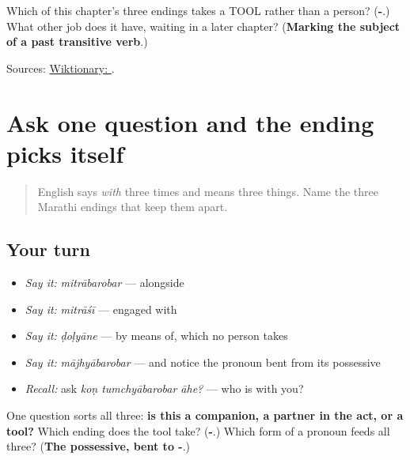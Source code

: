 \begin{tcolorbox}[breakable,colback=teal!4,colframe=teal!35!black,title={Before you move on}]
Which of this chapter's three endings takes a TOOL rather than a person? (\textbf{-}.) What other job does it have, waiting in a later chapter? (\textbf{Marking the subject of a past transitive verb}.)

Sources: \href{https://en.wiktionary.org/wiki/\%E0\%A4\%A8\%E0\%A5\%87}{Wiktionary: }.
\end{tcolorbox}
\section[\texorpdfstring{\mr{बरोबर} · -\mr{शी} · -\mr{ने} (barobar · -śī · -ne)}{बरोबर · -शी · -ने (barobar · -śī · -ne)}]{Ask one question and the ending picks itself}

\label{lesson:MR-R45-with}



\begin{quote}
English says \emph{with} three times and means three things. Name the three Marathi endings that keep them apart.
\end{quote}

\subsection*{Your turn}
\begin{itemize}
\raggedright
  \item \emph{Say it:} \emph{mitrābarobar} — alongside
  \item \emph{Say it:} \emph{mitrāśī} — engaged with
  \item \emph{Say it:} \emph{ḍoḷyāne} — by means of, which no person takes
  \item \emph{Say it:} \emph{mājhyābarobar} — and notice the pronoun bent from its possessive
  \item \emph{Recall:} ask \emph{koṇ tumchyābarobar āhe?} — who is with you?
\end{itemize}

\begin{tcolorbox}[breakable,colback=teal!4,colframe=teal!35!black,title={Before you move on}]
One question sorts all three: \textbf{is this a companion, a partner in the act, or a tool?} Which ending does the tool take? (\textbf{-}.) Which form of a pronoun feeds all three? (\textbf{The possessive, bent to -}.)
\end{tcolorbox}
